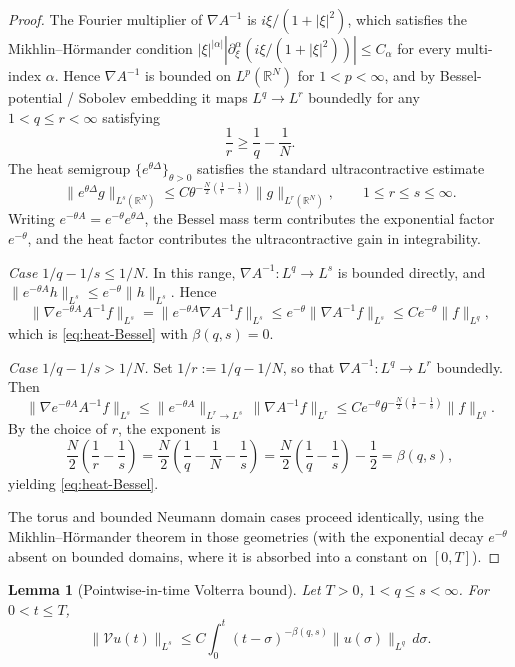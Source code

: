 \documentclass[11pt,reqno]{amsart}
\newtheorem{lemma}[theorem]{Lemma}
\theoremstyle{definition}
\theoremstyle{remark}
\newcommand{\R}{\mathbb{R}}
\newcommand{\Vop}{\mathcal{V}}
\begin{document}
\begin{proof}
The Fourier multiplier of $\nabla A^{-1}$ is $i\xi/(1+|\xi|^{2})$, which satisfies the Mikhlin--Hörmander condition $|\xi|^{|\alpha|}|\partial_\xi^{\alpha}(i\xi/(1+|\xi|^{2}))|\le C_\alpha$ for every multi-index $\alpha$. Hence $\nabla A^{-1}$ is bounded on $L^{p}(\R^{N})$ for $1<p<\infty$, and by Bessel-potential / Sobolev embedding it maps $L^{q}\to L^{r}$ boundedly for any $1<q\le r<\infty$ satisfying
\[
        \frac{1}{r}\ge\frac{1}{q}-\frac{1}{N}.
\]
The heat semigroup $\{e^{\theta\Delta}\}_{\theta>0}$ satisfies the standard ultracontractive estimate
\[
        \|e^{\theta\Delta}g\|_{L^{s}(\R^{N})}\le C\theta^{-\frac{N}{2}(\frac{1}{r}-\frac{1}{s})}\|g\|_{L^{r}(\R^{N})},
        \qquad 1\le r\le s\le\infty.
\]
Writing $e^{-\theta A}=e^{-\theta}e^{\theta\Delta}$, the Bessel mass term contributes the exponential factor $e^{-\theta}$, and the heat factor contributes the ultracontractive gain in integrability.

\emph{Case $1/q-1/s\le 1/N$.}
In this range, $\nabla A^{-1}:L^{q}\to L^{s}$ is bounded directly, and $\|e^{-\theta A}h\|_{L^{s}}\le e^{-\theta}\|h\|_{L^{s}}$. Hence
\[
        \|\nabla e^{-\theta A}A^{-1}f\|_{L^{s}}
        =\|e^{-\theta A}\nabla A^{-1}f\|_{L^{s}}
        \le e^{-\theta}\|\nabla A^{-1}f\|_{L^{s}}
        \le Ce^{-\theta}\|f\|_{L^{q}},
\]
which is \eqref{eq:heat-Bessel} with $\beta(q,s)=0$.

\emph{Case $1/q-1/s>1/N$.}
Set $1/r:=1/q-1/N$, so that $\nabla A^{-1}:L^{q}\to L^{r}$ boundedly. Then
\[
        \|\nabla e^{-\theta A}A^{-1}f\|_{L^{s}}
        \le \|e^{-\theta A}\|_{L^{r}\to L^{s}}\,\|\nabla A^{-1}f\|_{L^{r}}
        \le Ce^{-\theta}\theta^{-\frac{N}{2}(\frac{1}{r}-\frac{1}{s})}\|f\|_{L^{q}}.
\]
By the choice of $r$, the exponent is
\[
        \frac{N}{2}\!\left(\frac{1}{r}-\frac{1}{s}\right)
        =\frac{N}{2}\!\left(\frac{1}{q}-\frac{1}{N}-\frac{1}{s}\right)
        =\frac{N}{2}\!\left(\frac{1}{q}-\frac{1}{s}\right)-\frac{1}{2}=\beta(q,s),
\]
yielding \eqref{eq:heat-Bessel}.

The torus and bounded Neumann domain cases proceed identically, using the Mikhlin--Hörmander theorem in those geometries (with the exponential decay $e^{-\theta}$ absent on bounded domains, where it is absorbed into a constant on $[0,T]$).
\end{proof}

\begin{lemma}[Pointwise-in-time Volterra bound]\label{lem:Volterra-pointwise}
Let $T>0$, $1<q\le s<\infty$. For $0<t\le T$,
\begin{equation}\label{eq:Volterra-pointwise}
        \|\Vop u(t)\|_{L^{s}}
        \le C\int_0^t (t-\sigma)^{-\beta(q,s)}\|u(\sigma)\|_{L^{q}}\,d\sigma.
\end{equation}
\end{lemma}
\end{document}
